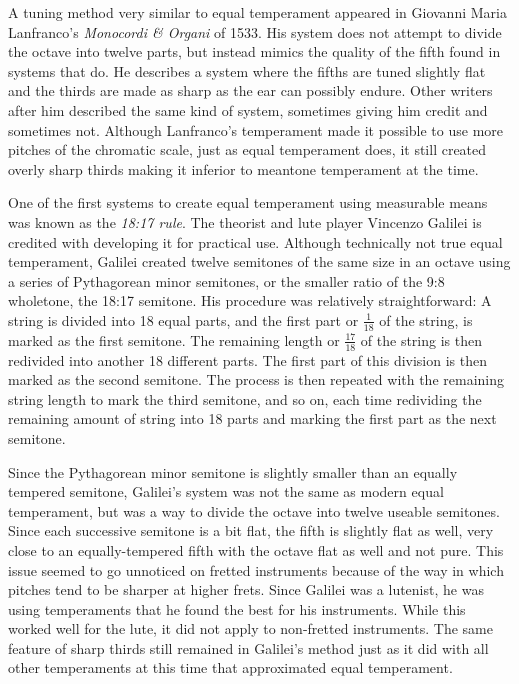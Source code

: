 A tuning method very similar to equal temperament appeared in Giovanni Maria
Lanfranco's \textit{Monocordi \& Organi} of 1533.  His system does not attempt to
divide the octave into twelve parts, but instead mimics the quality of the fifth found
in systems that do.  He describes a system where the fifths are tuned slightly flat and
the thirds are made as sharp as the ear can possibly endure. \autocite[45]{MB:1} Other
writers after him described the same kind of system, sometimes giving him credit and
sometimes not.  Although Lanfranco's temperament made it possible to use more pitches
of the chromatic scale, just as equal temperament does, it still created overly sharp
thirds making it inferior to meantone temperament at the time.

One of the first systems to create equal temperament using measurable means was known
as the \textit{18:17 rule}. The theorist and lute player Vincenzo Galilei is credited
with developing it for practical use. \autocite[57]{MB:1}  Although technically not
true equal temperament, Galilei created twelve semitones of the same size in an octave
using a series of Pythagorean minor semitones, or the smaller ratio of the 9:8
wholetone, the 18:17 semitone.  His procedure was relatively straightforward:  A string
is divided into 18 equal parts, and the first part or $ \frac{1}{18} $ of the string,
is marked as the first semitone.  The remaining length or $ \frac{17}{18} $ of the
string is then redivided into another 18 different parts.  The first part of this
division is then marked as the second semitone.  The process is then repeated with the
remaining string length to mark the third semitone, and so on, each time redividing the
remaining amount of string into 18 parts and marking the first part as the next
semitone.

Since the Pythagorean minor semitone is slightly smaller than an equally tempered
semitone, Galilei's system was not the same as modern equal temperament, but was a way
to divide the octave into twelve useable semitones. Since each successive semitone is a
bit flat, the fifth is slightly flat as well, very close to an equally-tempered fifth
with the octave flat as well and not pure.  This issue seemed to go unnoticed on
fretted instruments because of the way in which pitches  tend to be sharper at
higher frets.  Since Galilei was a lutenist, he was using temperaments that he found
the best for his instruments.  While this worked well for the lute, it did not
apply to non-fretted instruments.  The same feature of sharp thirds
still remained in Galilei's method just as it did with all other temperaments at this
time that approximated equal temperament.

